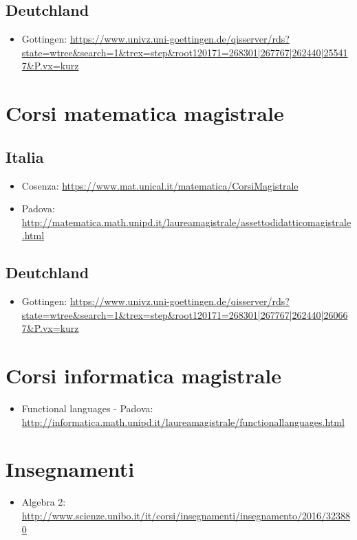 \documentclass[a4paper,10pt]{article}
\begin{document}
\subsection{Deutchland}
\begin{itemize}
 \item Gottingen: \url{https://www.univz.uni-goettingen.de/qisserver/rds?state=wtree&search=1&trex=step&root120171=268301|267767|262440|255417&P.vx=kurz}
\end{itemize}


\section*{Corsi matematica magistrale}
\subsection*{Italia}
\begin{itemize}
 \item Cosenza: \url{https://www.mat.unical.it/matematica/CorsiMagistrale}
 \item Padova: \url{http://matematica.math.unipd.it/laureamagistrale/assettodidatticomagistrale.html}
\end{itemize}

\subsection{Deutchland}
\begin{itemize}
 \item Gottingen: \url{https://www.univz.uni-goettingen.de/qisserver/rds?state=wtree&search=1&trex=step&root120171=268301|267767|262440|260667&P.vx=kurz}
\end{itemize}


\section{Corsi informatica magistrale}
\begin{itemize}
 \item Functional languages - Padova: \url{http://informatica.math.unipd.it/laureamagistrale/functionallanguages.html}
\end{itemize}


\section{Insegnamenti}
\begin{itemize}
 \item Algebra 2: \url{http://www.scienze.unibo.it/it/corsi/insegnamenti/insegnamento/2016/323880}
\end{itemize}
\end{document}
